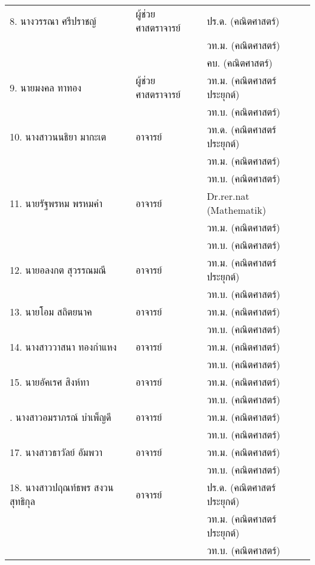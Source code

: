 {{\begin{center}
{\begin{longtable}{|p{}|l|p{}|}
			
			8.  นางวรรณา ศรีปราชญ์
			& ผู้ช่วยศาสตราจารย์
			& ปร.ด. (คณิตศาสตร์)\\
			&& วท.ม. (คณิตศาสตร์)\\
			&& คบ. (คณิตศาสตร์)\\\hline
			
			9. นายมงคล ทาทอง
			&	ผู้ช่วยศาสตราจารย์
			&วท.ม. (คณิตศาสตร์ประยุกต์)\\
			&&วท.บ. (คณิตศาสตร์)\\ \hline
			
			
			10. นางสาวนนธิยา มากะเต
			&อาจารย์
			&วท.ด. (คณิตศาสตร์ประยุกต์)\\
			&&วท.ม. (คณิตศาสตร์)\\
			&&วท.บ. (คณิตศาสตร์)\\\hline
			11. นายรัฐพรหม พรหมคำ
			&	อาจารย์
			&Dr.rer.nat (Mathematik)\\
			&&วท.ม. (คณิตศาสตร์)\\
			&&วท.บ. (คณิตศาสตร์)\\\hline
			
			
			12. นายอลงกต สุวรรณมณี
			&อาจารย์
			&วท.ม. (คณิตศาสตร์ประยุกต์)\\
			&&วท.บ. (คณิตศาสตร์)\\\hline
			
			
			13. นายโอม สถิตยนาค
			&อาจารย์	
			& วท.ม.  (คณิตศาสตร์) \\
			&&วท.บ. (คณิตศาสตร์)\\\hline
			
			14. นางสาววาสนา ทองกำแหง
			&อาจารย์
			&วท.ม. (คณิตศาสตร์)\\
			&&วท.บ. (คณิตศาสตร์)\\\hline
			
		
			15. นายอัคเรศ สิงห์ทา 
			&อาจารย์
			&วท.ม. (คณิตศาสตร์)\\
			&& วท.บ. (คณิตศาสตร์)\\\hline
			
			\newpage
			16. นางสาวอมราภรณ์ บำเพ็ญดี
			&อาจารย์
			&วท.ม. (คณิตศาสตร์)\\
			&&วท.บ. (คณิตศาสตร์)\\\hline
			
			
			17. นางสาวธาวัลย์ อัมพวา
			&	อาจารย์&วท.ม. (คณิตศาสตร์)\\
			&&วท.บ. (คณิตศาสตร์)\\\hline
			
			18. นางสาวปฤณท์ธพร สงวนสุทธิกุล 
			&อาจารย์&ปร.ด. (คณิตศาสตร์ประยุกต์)\\
			&&วท.ม. (คณิตศาสตร์ประยุกต์) \\
			&&วท.บ. (คณิตศาสตร์) \\\hline
	\end{longtable}}
\end{center} 
\printselfeval

}}
